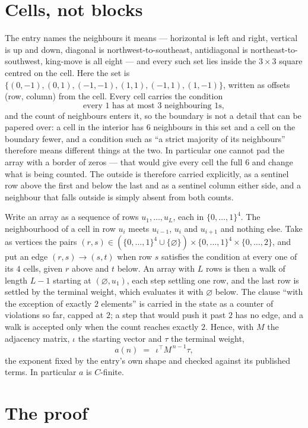 \documentclass[11pt,a4paper]{article}
\theoremstyle{plain}
\theoremstyle{definition}
\begin{document}
\section{Cells, not blocks}

The entry names the neighbours it means --- horizontal is left and right, vertical is up and
down, diagonal is northwest-to-southeast, antidiagonal is northeast-to-southwest, king-move is
all eight --- and every such set lies inside the $3\times3$ square centred on the cell. Here
the set is $\{(0,-1), (0,1), (-1,-1), (1,1), (-1,1), (1,-1)\}$, written as offsets (row, column) from the cell. Every cell carries
the condition
\[
\text{every 1 has at most 3 neighbouring 1s},
\]
and the count of neighbours enters it, so the boundary is not a detail that can be papered
over: a cell in the interior has $6$ neighbours in this set and a cell on the boundary
fewer, and a condition such as ``a strict majority of its neighbours'' therefore means
different things at the two. In particular one cannot pad the array with a border of zeros ---
that would give every cell the full $6$ and change what is being counted. The outside is
therefore carried
explicitly, as a sentinel row above the first and below the last and as a sentinel column
either side, and a neighbour that falls outside is simply absent from both counts.

Write an array as a sequence of rows $u_1,\dots,u_L$, each in
$\{0,\dots,1\}^{4}$. The neighbourhood of a cell in row $u_i$ meets $u_{i-1}$,
$u_i$ and $u_{i+1}$ and nothing else. Take as vertices the pairs
$(r,s)\in(\{0,\dots,1\}^{4}\cup\{\varnothing\})\times\{0,\dots,1\}^{4} \times \{0,\dots,2\}$,
and put an edge $(r,s)\to(s,t)$ when row $s$ satisfies the condition at every one of its
$4$ cells, given $r$ above and $t$ below. An array with $L$ rows is then a walk of length
$L-1$ starting at $(\varnothing,u_1)$, each step settling one row, and the last row is
settled by the terminal weight, which evaluates it with $\varnothing$ below. The clause ``with the exception of exactly $2$ elements'' is carried in
the state as a counter of violations so far, capped at $2$; a step that would push it past
$2$ has no edge, and a walk is accepted only when the count reaches exactly $2$. Hence,
with $M$ the adjacency matrix, $\iota$ the starting vector and $\tau$ the terminal weight,
\[
a(n)\;=\;\,\iota^{\!\top}M^{\,n-1}\tau ,
\]
the exponent fixed by the entry's own shape and checked against its published terms. In
particular $a$ is $C$-finite.

\section{The proof}
\end{document}

